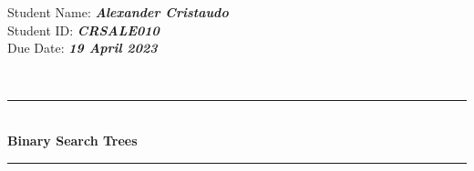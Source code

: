 \documentclass{article}
\newcommand{\HRule}[1]{\rule{\linewidth}{#1}}
\newcommand{\assignmentTitle}[4]{
    \begin{flushleft}
    \end{flushleft}
    \begin{flushright}
    Student Name: \textbf{\textit{#1}}\\ %
    Student ID: \textbf{\textit{#2}}\\ %
    Due Date: \textbf{\textit{#3}}
    \end{flushright}
    \normalsize \textsc{}
		\\ [2.0cm]
  \begin{center}
  \rule[0pt]{247pt}{1.5pt} \\
		\LARGE {\textbf{#4} } \\ %
  \rule[0pt]{247pt}{1.5pt} 
  \end{center} %
  
   

}
\begin{document}
\assignmentTitle{Alexander Cristaudo}{CRSALE010}{19 April 2023}{Binary Search Trees}
\end{document}
